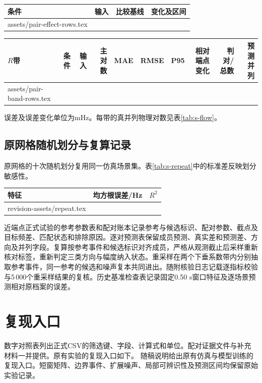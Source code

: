 \documentclass[UTF8,a4paper,11pt]{ctexart}
\makeatletter
\newcommand{\resultrows}[1]{\@@input #1 }
\makeatother
\begin{document}
\begin{center}
\small
{}
\label{tab:s-effects}
\begin{tabular}{llll}
\toprule
条件 & 输入 & 比较基线 & 变化及区间\\
\midrule
\resultrows{assets/pair-effect-rows.tex}
\bottomrule
\end{tabular}
\end{center}

\begin{center}
\small
{}
\label{tab:s-bands}
\setlength{\tabcolsep}{3pt}
\begin{tabular}{lllrrrrrrr}
\toprule
$R$带 & 条件 & 输入 & 主对数 & MAE & RMSE & P95 & 相对端点变化 & 判对/总数 & 预测并列\\
\midrule
\resultrows{assets/pair-band-rows.tex}
\bottomrule
\end{tabular}
\par\smallskip
\footnotesize 误差及误差变化单位为mHz。每带的真并列物理对数见表\ref{tab:s-flow}。
\end{center}

\clearpage
\subsection{原网格随机划分与复算记录}
原网格的十次随机划分复用同一仿真场景集。表\ref{tab:s-repeat}中的标准差反映划分敏感性。

\begin{center}
\small
{}
\label{tab:s-repeat}
\begin{tabular}{lrr}
\toprule
特征 & 均方根误差/Hz & $R^2$\\
\midrule
\resultrows{revision-assets/repeat.tex}
\bottomrule
\end{tabular}
\end{center}

近端点正式试验的参考参数表和配对账本记录参考与候选标识、配对参数、截点及目标频差、匹配状态和排除原因。逐对预测表保留成员预测、真实差和预测差、方向及并列字段。复算按参考事件和候选标识对齐成员，严格从观测截止后采样重新核对标签，重新判定三类方向与幅度纳入状态。重采样在两个下垂系数带内分别抽取参考事件，同一参考的候选和噪声复本共同进出。随附核验日志记载逐指标校验与5\,000个重采样结果的复核。历史基准检查表记录固定0.50 s窗口特征及逐场景预测相对原档案的误差。

\section{复现入口}
数字对照表列出正式CSV的筛选键、字段、计算式和单位。配对证据文件与补充材料一并提供。原有实验的复现入口如下。
随稿说明给出原有仿真与模型训练的复现入口。短窗矩阵、边界事件、扩展噪声、局部可辨识性及预测区间均保留原始实验记录。
\clearpage
\end{document}
